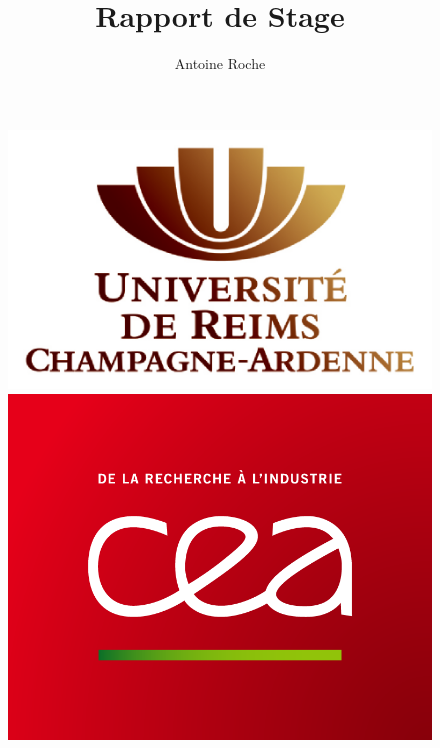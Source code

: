 \documentclass[12pt,a4paper,twoside]{article}
\author{Antoine Roche}
\title{Rapport de Stage}
\begin{document}
    \begin{titlepage}                                    %
        \begin{sffamily}
            \begin{center}


                \begin{figure}[h]
                    \begin{minipage}[c]{.46\linewidth}
                        \centering
                        \includegraphics[scale=0.2]{ressources/images/logos/Logo_Reims_University.png}
                    \end{minipage}
                    \hfill%
                    \begin{minipage}[c]{.46\linewidth}
                        \centering
                        \includegraphics[scale=0.1]{ressources/images/logos/logo_cea.png}

\end{minipage}
\end{figure}
\end{center}
\end{sffamily}
\end{titlepage}
\end{document}

